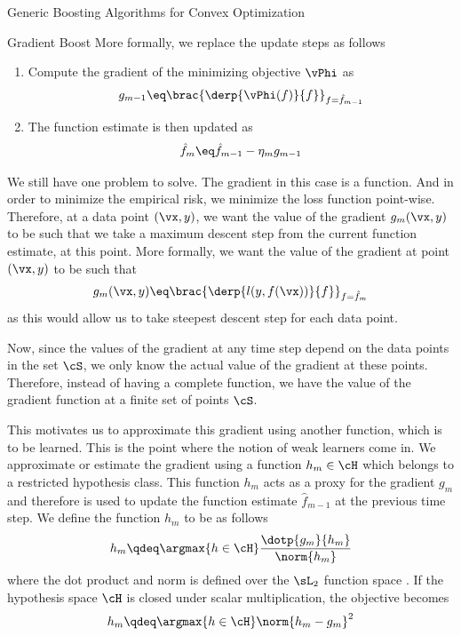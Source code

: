 \documentclass{article}
\begin{document}
\begin{psection}{Generic Boosting Algorithms for Convex Optimization}
\begin{psubsection}{Gradient Boost}
		More formally, we replace the update steps as follows
		\begin{enumerate}
			\item Compute the gradient of the minimizing objective $\vPhi$ as
				\begin{align*}
					g_{m - 1} \eq \brac{\derp{\vPhi(f)}{f}}_{f = \hat{f}_{m - 1}}
				\end{align*}
			\item The function estimate is then updated as
				\begin{align*}
					\hat{f}_m \eq \hat{f}_{m - 1} - \eta_m g_{m - 1}
				\end{align*}
		\end{enumerate}

		We still have one problem to solve. The gradient in this case is a function. And in order to minimize the empirical risk, we minimize the loss function point-wise. Therefore, at a data point $(\vx, y)$, we want the value of the gradient $g_m(\vx, y)$ to be such that we take a maximum descent step from the current function estimate, at this point. More formally, we want the value of the gradient at point $(\vx, y)$ to be such that
		\begin{align*}
			g_m(\vx, y) \eq \brac{\derp{l(y, f(\vx))}{f}}_{f = \hat{f}_{m}}
		\end{align*}
		as this would allow us to take steepest descent step for each data point.

		Now, since the values of the gradient at any time step depend on the data points in the set $\cS$, we only know the actual value of the gradient at these points. Therefore, instead of having a complete function, we have the value of the gradient function at a finite set of points $\cS$.

		This motivates us to approximate this gradient using another function, which is to be learned. This is the point where the notion of weak learners come in. We approximate or estimate the gradient using a function $h_m \in \cH$ which belongs to a restricted hypothesis class. This function $h_m$ acts as a proxy for the gradient $g_m$ and therefore is used to update the function estimate $\hat{f}_{m - 1}$ at the previous time step. We define the function $h_m$ to be as follows
		\begin{equation}
			h_m \qdeq \argmax{h \in \cH} \frac{\dotp{g_m}{h_m}}{\norm{h_m}}
			\label{eq:weak-obj}
		\end{equation}
		where the dot product and norm is defined over the $\sL_2$ function space \citep{functionspace}. If the hypothesis space $\cH$ is closed under scalar multiplication, the objective becomes \citep{cvx-boosting}
		\begin{equation}
			h_m \qdeq \argmax{h \in \cH} \norm{h_m - g_m}^2
			\label{eq:weak-obj-closed}
		\end{equation}


\end{psubsection}
\end{psection}
\end{document}
